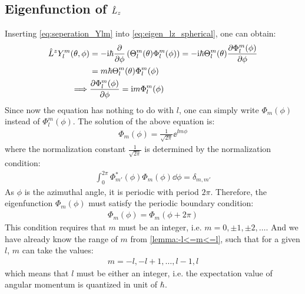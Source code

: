 \subsection{Eigenfunction of \texorpdfstring{$\hat{L}_z$}{Lz}}
Inserting \cref{eq:seperation_Ylm} into \cref{eq:eigen_lz_spherical}, one can obtain:
\begin{align}
    \hat{L}^z Y_l^m (\theta,\phi) &= - \mathrm{i} \hbar \frac{\partial }{\partial \phi} \left( \Theta_l^m(\theta) \Phi_l^m(\phi) \right) = - \mathrm{i} \hbar \Theta_l^m(\theta) \frac{\partial \Phi_l^m(\phi)}{\partial \phi} \notag \\
    &= m \hbar \Theta_l^m(\theta) \Phi_l^m(\phi) \notag \\
    \implies &\frac{\partial \Phi_l^m(\phi)}{\partial \phi} = \mathrm{i} m \Phi_l^m(\phi) 
\end{align}
Since now the equation has nothing to do with $l$, one can simply write $\Phi_m(\phi)$ instead of $\Phi_l^m(\phi)$. The solution of the above equation is:
\begin{align}
    \Phi_m(\phi) = \frac{1}{\sqrt{2 \pi}} \ee^{\ii m \phi}
\end{align}
where the normalization constant $\frac{1}{\sqrt{2 \pi}}$ is determined by the normalization condition:
\begin{align}
    \int_0^{2 \pi} \Phi^*_{m'} (\phi) \Phi_m(\phi) \dd \phi = \delta_{m,m'}
\end{align}
As $\phi$ is the azimuthal angle, it is periodic with period $2 \pi$. Therefore, the eigenfunction $\Phi_m(\phi)$ must satisfy the periodic boundary condition:
\begin{align}
    \Phi_m(\phi) = \Phi_m(\phi + 2 \pi)
\end{align}
This condition requires that $m$ must be an integer, i.e. $m = 0, \pm 1, \pm 2, \ldots$. And we have already know the range of $m$ from \cref{lemma:-l<=m<=l}, such that for a given $l$, $m$ can take the values:
\begin{align}
    m = -l, -l+1, \ldots, l-1, l
\end{align} 
which means that $l$ must be either an integer, i.e. the expectation value of angular momentum is quantized in unit of $\hbar$.

